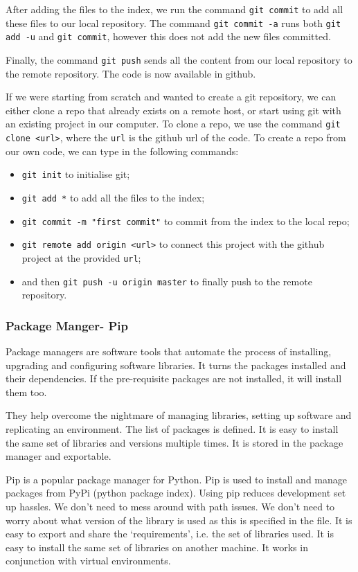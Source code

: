 \documentclass[a4paper, openany]{memoir}
\begin{document}
    After adding the files to the index, we run the command \texttt{git commit} to add all these files to our local repository. The command \texttt{git commit -a} runs both \texttt{git add -u} and \texttt{git commit}, however this does not add the new files committed.

    Finally, the command \texttt{git push} sends all the content from our local repository to the remote repository. The code is now available in github.

    If we were starting from scratch and wanted to create a git repository, we can either clone a repo that already exists on a remote host, or start using git with an existing project in our computer. To clone a repo, we use the command \texttt{git clone <url>}, where the \texttt{url} is the github url of the code. 
    To create a repo from our own code, we can type in the following commands:
    \begin{itemize}
        \item \texttt{git init} to initialise git; 
        \item \texttt{git add *} to add all the files to the index;
        \item \texttt{git commit -m "first commit"} to commit from the index to the local repo;
        \item \texttt{git remote add origin <url>} to connect this project with the github project at the provided \texttt{url}; 
        \item and then \texttt{git push -u origin master} to finally push to the remote \newline repository.
    \end{itemize}

    \subsubsection{Package Manger- Pip}
    Package managers are software tools that automate the process of installing, upgrading and configuring software libraries. It turns the packages installed and their dependencies. If the pre-requisite packages are not installed, it will install them too. 

    They help overcome the nightmare of managing libraries, setting up software and replicating an environment. The list of packages is defined. It is easy to install the same set of libraries and versions multiple times. It is stored in the package manager and exportable.

    Pip is a popular package manager for Python. Pip is used to install and manage packages from PyPi (python package index). Using pip reduces development set up hassles. We don't need to mess around with path issues. We don't need to worry about what version of the library is used as this is specified in the file. It is easy to export and share the `requirements', i.e. the set of libraries used. It is easy to install the same set of libraries on another machine. It works in conjunction with virtual environments.
\end{document}
